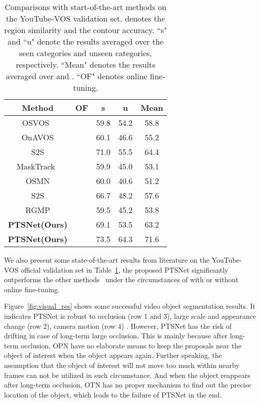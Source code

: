 \documentclass[10pt,twocolumn,letterpaper]{article}
\newcommand{\cmark}{\ding{51}}\newcommand{\xmark}{\ding{55}}
\begin{document}
    \begin{table}[b]
\caption{Comparisons with start-of-the-art methods on the YouTube-VOS validation set.  denotes the region similarity and the contour accuracy. ``s" and ``u" denote the results averaged over the seen categories and unseen categories, respectively. ``Mean" denotes the results averaged over  and . ``OF" denotes online fine-tuning.}
    \vspace{2mm}
      \centering
\setlength{\tabcolsep}{2mm}
{\begin{tabular}{c | c | c c | c}
        \toprule
        Method                              &   OF    &  s &  u &  Mean \\
        \midrule
        OSVOS~\cite{osvos_cvpr17}           & \cmark  & 59.8 & 54.2 & 58.8 \\
        OnAVOS \cite{onavos_bmvc17}         & \cmark  & 60.1 & 46.6 & 55.2 \\
        S2S \cite{yvos_eccv18}              & \cmark  & 71.0 & 55.5 & 64.4 \\
\midrule
        MaskTrack~\cite{masktrack_cvpr17}   & \xmark  & 59.9 & 45.0 & 53.1 \\
        OSMN \cite{Yang2018osmn}            & \xmark  & 60.0 & 40.6 & 51.2 \\
        S2S \cite{yvos_eccv18}              & \xmark  & 66.7 & 48.2 & 57.6 \\
        RGMP \cite{rgmp_cvpr18}             & \xmark  & 59.5 & 45.2 & 53.8 \\
        \midrule
        \textbf{PTSNet(Ours)}               & \xmark  & 69.1 & 53.5 & 63.2 \\
        \textbf{PTSNet(Ours)}               & \cmark  & 73.5 & 64.3 & 71.6 \\
        \bottomrule
      \end{tabular}}
      \label{table:yvos18}
    \end{table}

We also present some state-of-the-art results from literature on the YouTube-VOS official validation set in Table~\ref{table:yvos18}, the proposed PTSNet significantly outperforms the other methods~\cite{osvos_cvpr17, masktrack_cvpr17, Yang2018osmn, onavos_bmvc17, yvos_eccv18} under the circumstances of with or without online fine-tuning. 

Figure~\ref{fig:visual_res} shows some successful video object segmentation results. It indicates PTSNet is robust to occlusion (row 1 and 3), large scale and appearance change (row 2), camera motion (row 4) \etc. However, PTSNet has the risk of drifting in case of long-term large occlusion. This is mainly because after long-term occlusion, OPN have no elaborate means to keep the proposals near the object of interest when the object appears again. Further speaking, the assumption that the object of interest will not move too much within nearby frames can not be utilized in such circumstance. And when the object reappears after long-term occlusion, OTN has no proper mechanism to find out the precise location of the object, which leads to the failure of PTSNet in the end.
\end{document}
